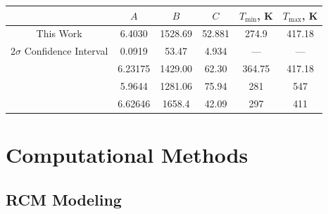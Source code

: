 \documentclass[letterpaper, review, sort&compress]{elsarticle}
\begin{document}
\begin{center}
    \captionsetup{type=figure}
    
    \caption{Saturated vapor pressure of MV as a function of temperature,
    plotted using the Antoine equation, \cref{eq:antoine}, with
    \(A=6.4030\), \(B=1528.69\), and \(C=52.881\).}
    \label{fig:vapor-pressure}
\end{center}

\begin{center}
    \captionsetup{type=table}
    \caption{Antoine Equation coefficients computed in this work and obtained from the literature,
    in units of \si{\kelvin} and \si{\kPa}. The $2\sigma$ confidence interval is estimated by taking
    the square root of the diagonals of the covariance matrix returned from \texttt{curve\_fit()}}
    \label{tab:antoine}
    \begin{tabular}{cccccc}
        \toprule
        & $A$ & $B$ & $C$ & $T_{\text{min}}$, \si{\K} & $T_{\text{max}}$, \si{\K} \\
        \midrule
        This Work & 6.4030 & 1528.69 & 52.881 & 274.9 & 417.18 \\
        $2\sigma$ Confidence Interval & 0.0919 & 53.47 & 4.934 & --- & --- \\
        \citet{Ortega2003} & 6.23175 & 1429.00 & 62.30 & 364.75 & 417.18 \\
        \citet{Camacho2007} & 5.9644 & 1281.06 & 75.94 & 281 & 547 \\
        \citet{Stephenson1987} & 6.62646 & 1658.4 & 42.09 & 297 & 411 \\
        \bottomrule
    \end{tabular}
\end{center}

\section{Computational Methods}\label{sec:computational-methods}
\subsection{RCM Modeling}\label{sec:experimental-modeling}
\end{document}
